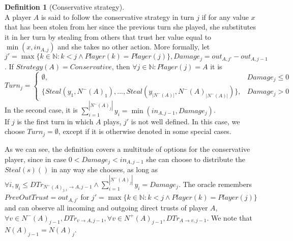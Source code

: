 \documentclass[11pt]{article}
\theoremstyle{definition}
\newtheorem{definition}{Definition}[section]
\theoremstyle{corollary}
\theoremstyle{lemma}
\begin{document}
      \begin{definition}[Conservative strategy] \ \\
         A player $A$ is said to follow the conservative strategy in turn $j$ if for any value $x$ that has been stolen from
         her since the previous turn she played, she substitutes it in her turn by stealing from others that trust her value
         equal to $\min{(x,in_{A,j})}$ and she takes no other action.
         More formally, let $j' = \max\{k \in \mathbb{N} : k < j \wedge Player(k) = Player(j)\}, Damage_j = out_{A,j'} -
         out_{A,j-1}$. If $Strategy(A) = Conservative$, then $\forall j \in \mathbb{N}: Player(j) = A$ it is $$Turn_j =
         \begin{cases}
            \emptyset, & Damage_j \leq 0 \\
            \{Steal(y_1,N^{-}(A)_1),...,Steal(y_{|N^{-}(A)|},N^{-}(A)_{|N^{-}(A)|})\}, & Damage_j > 0
         \end{cases}$$
         In the second case, it is $\sum\limits_{i=1}^{|N^{-}(A)_j|}y_i = \min(in_{A,j-1}, Damage_j)$. \\
         If $j$ is the first turn in which $A$ plays, $j'$ is not well defined. In this case, we choose $Turn_j = \emptyset$,
         except if it is otherwise denoted in some special cases. \\
      \end{definition}
      As we can see, the definition covers a multitude of options for the conservative player, since in case $0 < Damage_j <
      in_{A,j-1}$ she can choose to distribute the $Steal(s)()$ in any way she chooses, as long as $\forall i, y_i \leq
      DTr_{N^{-}(A)_{j,i} \rightarrow A, j-1} \wedge \sum\limits_{i=1}^{|N^{-}(A)_j|}y_i = Damage_j$.
      The oracle remembers $PrevOutTrust = out_{A, j'}$ for  $j' = \max\{k \in \mathbb{N} : k < j \wedge Player(k) =
      Player(j)\}$ and can observe all incoming and outgoing direct trusts of player $A$, $\forall v \in N^{-}(A)_{j-1},
      DTr_{v \rightarrow A, j-1}, \forall v \in N^{+}(A)_{j-1}, DTr_{A \rightarrow v, j-1}$. We note that
      $N(A)_{j-1} = N(A)_j$. \\
\end{document}
